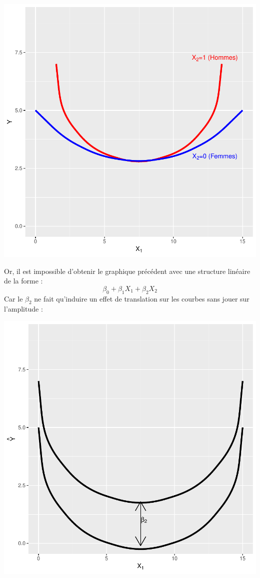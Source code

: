 \documentclass[11pt,french]{report}
\begin{document}
\includegraphics{notes_de_cours-047}

Or, il est impossible d'obtenir le graphique précédent avec une structure linéaire de la forme :
$$
\beta_0 + \beta_1X_1 + \beta_2X_2
$$
Car le $\beta_2$ ne fait qu'induire un effet de translation sur les courbes sans jouer sur l'amplitude :

\includegraphics{notes_de_cours-048}
\end{document}
